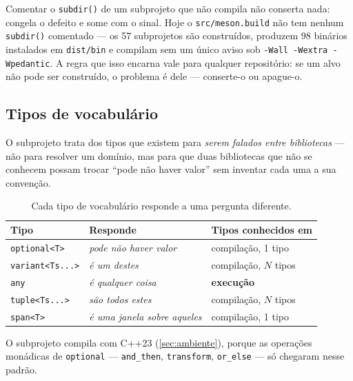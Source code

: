 \begin{regra}
Comentar o \texttt{subdir()} de um subprojeto que não compila não conserta
nada: congela o defeito e some com o sinal. Hoje o \texttt{src/meson.build}
não tem nenhum \texttt{subdir()} comentado --- os 57 subprojetos são
construídos, produzem 98 binários instalados em \texttt{dist/bin} e compilam
sem um único aviso sob \texttt{-Wall -Wextra -Wpedantic}. A regra que isso
encarna vale para qualquer repositório: se um alvo não pode ser construído, o
problema é dele --- conserte-o ou apague-o.
\end{regra}

\subsection{Tipos de vocabulário}
\label{sec:vocabulary}

O subprojeto  trata dos tipos que existem para
\emph{serem falados entre bibliotecas} --- não para resolver um domínio, mas
para que duas bibliotecas que não se conhecem possam trocar ``pode não haver
valor'' sem inventar cada uma a sua convenção.

\begin{table}[htbp]
\centering
\caption{Cada tipo de vocabulário responde a uma pergunta diferente.}
\label{tab:vocabulario}
\footnotesize
\begin{tabular}{@{}lll@{}}
\toprule
\textbf{Tipo} & \textbf{Responde} & \textbf{Tipos conhecidos em} \\
\midrule
\texttt{optional<T>}      & \emph{pode não haver valor}   & compilação, 1 tipo \\
\texttt{variant<Ts...>}   & \emph{é um destes}            & compilação, $N$ tipos \\
\texttt{any}              & \emph{é qualquer coisa}       & \textbf{execução} \\
\texttt{tuple<Ts...>}     & \emph{são todos estes}        & compilação, $N$ tipos \\
\texttt{span<T>}          & \emph{é uma janela sobre aqueles} & compilação, 1 tipo \\
\bottomrule
\end{tabular}
\end{table}

O subprojeto compila com C++23 (\cref{sec:ambiente}), porque as operações
monádicas de \texttt{optional} --- \texttt{and\_then}, \texttt{transform},
\texttt{or\_else} --- só chegaram nesse padrão.


